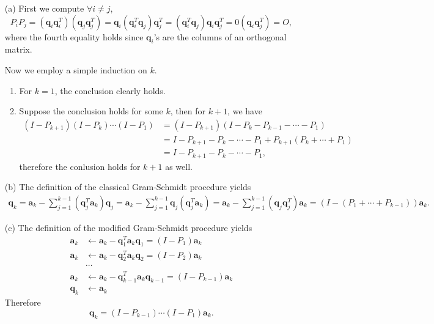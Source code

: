 \begin{sol}
  \begin{itemize}
  \item[(a)]
    First we compute $\forall i\neq j$,
    \begin{displaymath}
      P_iP_j = (\mathbf{q}_i\mathbf{q}_i^T)(\mathbf{q}_j\mathbf{q}_j^T)
      = \mathbf{q}_i(\mathbf{q}_i^T\mathbf{q}_j)\mathbf{q}_j^T
      = (\mathbf{q}_i^T\mathbf{q}_j)\mathbf{q}_i\mathbf{q}_j^T
      = 0(\mathbf{q}_i\mathbf{q}_j^T) = O,
    \end{displaymath}
    where the fourth equality holds since $\mathbf{q}_i$'s
    are the columns of an orthogonal matrix.

    Now we employ a simple induction on $k$.
    \begin{enumerate}
    \item
      For $k=1$, the conclusion clearly holds.

    \item
      Suppose the conclusion holds for some $k$,
      then for $k+1$, we have
      \begin{align*}
        (I-P_{k+1})(I-P_k)\cdots(I-P_1) &= (I-P_{k+1})(I-P_k-P_{k-1}-\cdots-P_1) \\
                                        &= I - P_{k+1}-P_k-\cdots-P_1 + P_{k+1}(P_k+\cdots+P_1) \\
        &= I - P_{k+1} - P_k -\cdots -P_1,
      \end{align*}
      therefore the conlusion holds for $k+1$ as well.
    \end{enumerate}

  \item[(b)]
    The definition of the classical Gram-Schmidt procedure yields
    \begin{align*}
      \mathbf{q}_k = \mathbf{a}_k - \sum_{j=1}^{k-1}(\mathbf{q}_j^T\mathbf{a}_k)\mathbf{q}_j = \mathbf{a}_k - \sum_{j=1}^{k-1}\mathbf{q}_j(\mathbf{q}_j^T\mathbf{a}_k) = \mathbf{a}_k - \sum_{j=1}^{k-1}(\mathbf{q}_j\mathbf{q}_j^T)\mathbf{a}_k = (I-(P_1+\cdots+P_{k-1}))\mathbf{a}_k.
    \end{align*}

  \item[(c)]
    The definition of the modified Gram-Schmidt procedure yields
    \begin{align*}
      \mathbf{a}_k &\leftarrow \mathbf{a}_k - \mathbf{q}_1^T\mathbf{a}_k\mathbf{q}_1 = (I-P_1)\mathbf{a}_k \\
      \mathbf{a}_k &\leftarrow \mathbf{a}_k - \mathbf{q}_2^T\mathbf{a}_k\mathbf{q}_2 = (I-P_2)\mathbf{a}_{k} \\
                   & \cdots \\
      \mathbf{a}_k &\leftarrow \mathbf{a}_k - \mathbf{q}_{k-1}^T\mathbf{a}_k\mathbf{q}_{k-1} = (I-P_{k-1})\mathbf{a}_k \\
      \mathbf{q}_k &\leftarrow \mathbf{a}_k
    \end{align*}
    Therefore
    \begin{displaymath}
      \mathbf{q}_k = (I-P_{k-1})\cdots(I-P_1)\mathbf{a}_k.
    \end{displaymath}


\end{itemize}
\end{sol}
